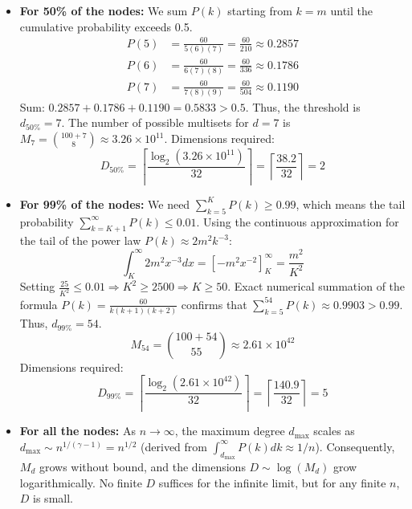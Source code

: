 \documentclass[11pt]{article}
\begin{document}
\begin{itemize}
    \item \textbf{For 50\% of the nodes:}
    We sum $P(k)$ starting from $k=m$ until the cumulative probability exceeds 0.5.
    \begin{align*}
        P(5) &= \frac{60}{5(6)(7)} = \frac{60}{210} \approx 0.2857 \\
        P(6) &= \frac{60}{6(7)(8)} = \frac{60}{336} \approx 0.1786 \\
        P(7) &= \frac{60}{7(8)(9)} = \frac{60}{504} \approx 0.1190
    \end{align*}
    Sum: $0.2857 + 0.1786 + 0.1190 = 0.5833 > 0.5$.
    Thus, the threshold is $d_{50\%} = 7$.
    The number of possible multisets for $d=7$ is $M_{7} = \binom{100+7}{8} \approx 3.26 \times 10^{11}$.
    Dimensions required:
    $$ D_{50\%} = \left\lceil \frac{\log_2(3.26 \times 10^{11})}{32} \right\rceil = \left\lceil \frac{38.2}{32} \right\rceil = 2 $$

    \item \textbf{For 99\% of the nodes:}
    We need $\sum_{k=5}^{K} P(k) \ge 0.99$, which means the tail probability $\sum_{k=K+1}^{\infty} P(k) \le 0.01$.
    Using the continuous approximation for the tail of the power law $P(k) \approx 2m^2 k^{-3}$:
    $$ \int_{K}^{\infty} 2m^2 x^{-3} dx = \left[ -m^2 x^{-2} \right]_{K}^{\infty} = \frac{m^2}{K^2} $$
    Setting $\frac{25}{K^2} \le 0.01 \Rightarrow K^2 \ge 2500 \Rightarrow K \ge 50$.
    Exact numerical summation of the formula $P(k) = \frac{60}{k(k+1)(k+2)}$ confirms that $\sum_{k=5}^{54} P(k) \approx 0.9903 > 0.99$.
    Thus, $d_{99\%} = 54$.
    $$ M_{54} = \binom{100+54}{55} \approx 2.61 \times 10^{42} $$
    Dimensions required:
    $$ D_{99\%} = \left\lceil \frac{\log_2(2.61 \times 10^{42})}{32} \right\rceil = \left\lceil \frac{140.9}{32} \right\rceil = 5 $$

    \item \textbf{For all the nodes:}
    As $n \to \infty$, the maximum degree $d_{\max}$ scales as $d_{\max} \sim n^{1/(\gamma-1)} = n^{1/2}$ (derived from $\int_{d_{\max}}^\infty P(k)dk \approx 1/n$).
    Consequently, $M_d$ grows without bound, and the dimensions $D \sim \log(M_d)$ grow logarithmically. No finite $D$ suffices for the infinite limit, but for any finite $n$, $D$ is small.
\end{itemize}
\end{document}
